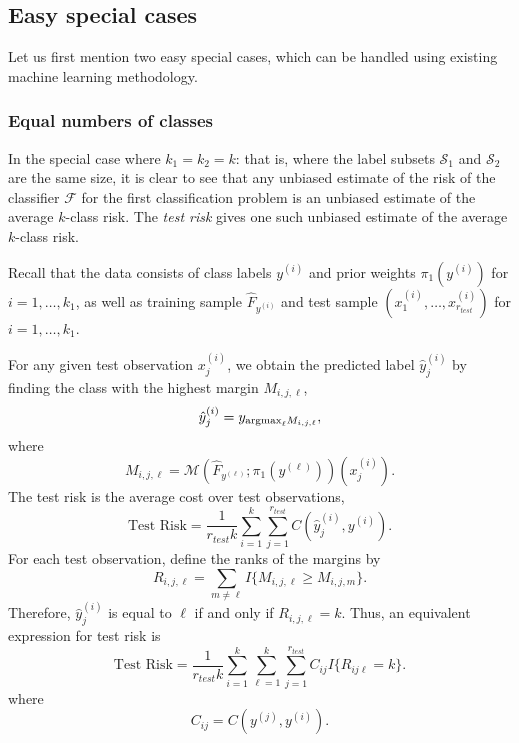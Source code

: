 \documentclass[12pt]{article}
\begin{document}
\subsection{Easy special cases}

Let us first mention two easy special cases, which can be handled
using existing machine learning methodology.

\subsubsection{Equal numbers of classes}

In the special case where $k_1 = k_2 = k$: that is, where the label
subsets $\mathcal{S}_1$ and $\mathcal{S}_2$ are the same size, it is
clear to see that any unbiased estimate of the risk of the classifier
$\mathcal{F}$ for the first classification problem is an unbiased
estimate of the average $k$-class risk.  The \emph{test risk}
gives one such unbiased estimate of the average $k$-class risk.

Recall that the data consists of class labels $y^{(i)}$ and prior
weights $\pi_1(y^{(i)})$ for $i = 1,\hdots, k_1$, as well as training
sample $\hat{F}_{y^{(i)}}$ and test sample $(x_1^{(i)},\hdots,
x_{r_{test}}^{(i)})$ for $i = 1,\hdots, k_1$.

For any given test observation $x_j^{(i)}$, we obtain the predicted
label $\hat{y}_j^{(i)}$ by finding the class with the highest margin $M_{i, j, \ell}$,
\[
\hat{y}_j^{(i)} = y_{\text{argmax}_\ell M_{i, j, \ell}},
\]
where
\[ 
M_{i, j, \ell} = \mathcal{M}(\hat{F}_{y^{(\ell)}}; \pi_1(y^{(\ell)}))(x_j^{(i)}).
\]
The test risk is the average cost over test observations,
\begin{equation}
\text{Test Risk} = \frac{1}{r_{test}k} \sum_{i=1}^k \sum_{j=1}^{r_{test}} C(\hat{y}_j^{(i)}, y^{(i)}).
\end{equation}
For each test observation, define the ranks of the margins by
\[
R_{i,j,\ell} = \sum_{m \neq \ell} I\{M_{i,j,\ell} \geq M_{i, j, m}\}.
\]
Therefore, $\hat{y}_j^{(i)}$ is equal to $\ell$ if and only if $R_{i,j,\ell} = k$.
Thus, an equivalent expression for test risk is
\begin{equation}\label{eq:test_risk}
\text{Test Risk} = \frac{1}{r_{test}k} \sum_{i=1}^k \sum_{\ell=1}^k \sum_{j=1}^{r_{test}} C_{ij} I\{R_{ij\ell} = k\}.
\end{equation}
where
\[
C_{ij} = C(y^{(j)}, y^{(i)}).
\]
\end{document}
